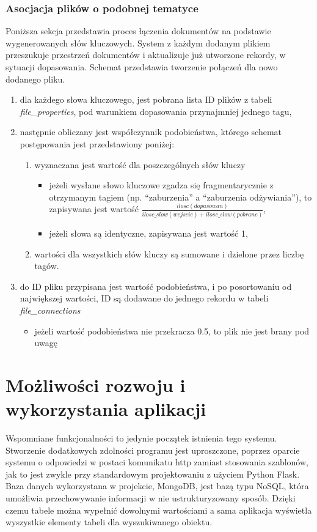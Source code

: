 \documentclass[12pt,a4paper,twoside]{article}
\begin{document}
\subsubsection{Asocjacja plików o podobnej tematyce}
Poniższa sekcja przedstawia proces łączenia dokumentów na podstawie wygenerowanych słów kluczowych. System z każdym dodanym plikiem przeszukuje przestrzeń dokumentów i aktualizuje już utworzone rekordy, w sytuacji dopasowania. Schemat przedstawia tworzenie połączeń dla nowo dodanego pliku.
\begin{enumerate}
\item dla każdego słowa kluczowego, jest pobrana lista ID plików z tabeli \textit{file\_properties}, pod warunkiem dopasowania przynajmniej jednego tagu,
\item następnie obliczany jest współczynnik podobieństwa, którego schemat postępowania jest przedstawiony poniżej:
	\begin{enumerate}
		\item wyznaczana jest wartość dla poszczególnych słów kluczy
		\begin{itemize}
			\item jeżeli wysłane słowo kluczowe zgadza się fragmentarycznie z otrzymanym tagiem (np. ``zaburzenia'' a ``zaburzenia odżywiania''), to zapisywana jest wartość $\frac{ilosc(dopasowan)}{ilosc\_slow(wejscie)+ilosc\_slow(pobrane)}$,
			\item jeżeli słowa są identyczne, zapisywana jest wartość 1,
		\end{itemize}
		\item wartości dla wszystkich słów kluczy są sumowane i dzielone przez liczbę tagów.
	\end{enumerate}
\item do ID pliku przypisana jest wartość podobieństwa, i po posortowaniu od największej wartości, ID są dodawane do jednego rekordu w tabeli \textit{file\_connections}
	\begin{itemize}
		\item jeżeli wartość podobieństwa nie przekracza 0.5, to plik nie jest brany pod uwagę
	\end{itemize}
\end{enumerate}
\newpage
\section{Możliwości rozwoju i wykorzystania aplikacji}
Wspomniane funkcjonalności to jedynie początek istnienia tego systemu. Stworzenie dodatkowych zdolności programu jest uproszczone, poprzez oparcie systemu o odpowiedzi w postaci komunikatu http zamiast stosowania szablonów, jak to jest zwykle przy standardowym projektowaniu z użyciem Python Flask. Baza danych wykorzystana w projekcie, MongoDB, jest bazą typu NoSQL, która umożliwia przechowywanie informacji w nie ustrukturyzowany sposób. Dzięki czemu tabele można wypełnić dowolnymi wartościami a sama aplikacja wyświetla wyszystkie elementy tabeli dla wyszukiwanego obiektu.\par
\end{document}
